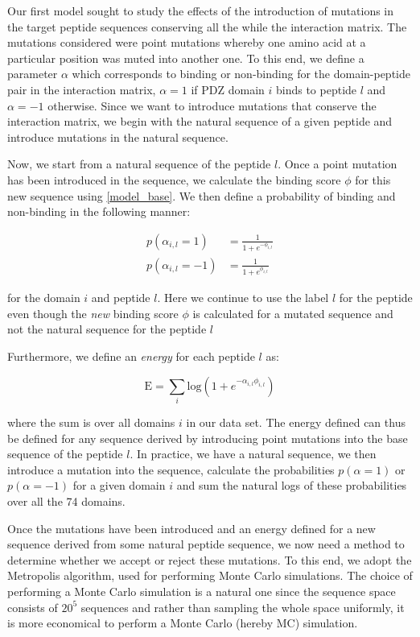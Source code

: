 \documentclass[a4paper, 12pt]{article}
\begin{document}
	Our first model sought to study the effects of the introduction of mutations in the target peptide sequences conserving all the while the interaction matrix. The mutations considered were point mutations whereby one amino acid at a particular position was muted into another one. To this end, we define a parameter $\alpha$ which corresponds to binding or non-binding for the domain-peptide pair in the interaction matrix, $\alpha=1$ if PDZ domain $i$ binds to peptide $l$ and $\alpha = -1$ otherwise. Since we want to introduce mutations that conserve the interaction matrix, we begin with the natural sequence of a given peptide and introduce mutations in the natural sequence. 

	Now, we start from a natural sequence of the peptide $l$. Once a point mutation has been introduced in the sequence, we calculate the binding score $\phi$ for this new sequence using \eqref{model_base}. We then define a probability of binding and non-binding in the following manner:

	\begin{align}
	\label{model_1_naive}
	p(\alpha_{i,l}=1) & = \frac{1}{1+e^{-\phi_{i,l}}} \\
	p(\alpha_{i,l}=-1) & = \frac{1}{1+e^{\phi_{i,l}}}
	\end{align}

	for the domain $i$ and peptide $l$. Here we continue to use the label $l$ for the peptide even though the \emph{new} binding score $\phi$ is calculated for a mutated sequence and not the natural sequence for the peptide $l$

	Furthermore, we define an \emph{energy} for each peptide $l$ as:

	\begin{equation}
	\label{model_1_energy}
	\mathrm{E} = \sum_{i} \mathrm{log}(1+e^{-\alpha_{i,l}\phi_{i,l}})
	\end{equation}

	where the sum is over all domains $i$ in our data set. The energy defined can thus be defined for any sequence derived by introducing point mutations into the base sequence of the peptide $l$. In practice, we have a natural sequence, we then introduce a mutation into the sequence, calculate the probabilities $p(\alpha=1)$ or $p(\alpha=-1)$ for a given domain $i$ and sum the natural logs of these probabilities over all the 74 domains. 

	Once the mutations have been introduced and an energy defined for a new sequence derived from some natural peptide sequence, we now need a method to determine whether we accept or reject these mutations. To this end, we adopt the Metropolis algorithm, used for performing Monte Carlo simulations. The choice of performing a Monte Carlo simulation is a natural one since the sequence space consists of $20^5$ sequences and rather than sampling the whole space uniformly, it is more economical to perform a Monte Carlo (hereby MC) simulation.
\end{document}
